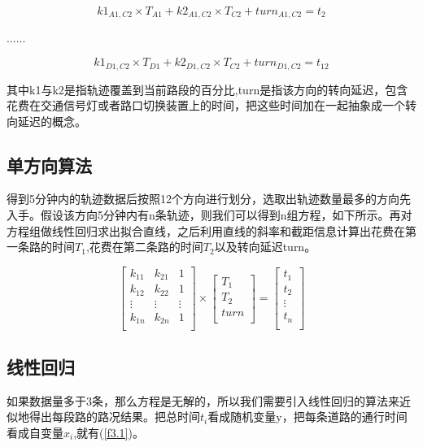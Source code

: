 \begin{equation*}
k1_{A1,C2} \times T_{A1} + k2_{A1,C2} \times T_{C2} + turn_{A1,C2} = t_{2}
\end{equation*}

......

\begin{equation*}
k1_{D1,C2} \times T_{D1} + k2_{D1,C2} \times T_{C2} + turn_{D1,C2} = t_{12}
\end{equation*}

其中k1与k2是指轨迹覆盖到当前路段的百分比,turn是指该方向的转向延迟，包含花费在交通信号灯或者路口切换装置上的时间，把这些时间加在一起抽象成一个转向延迟的概念。

\subsection{单方向算法}

得到5分钟内的轨迹数据后按照12个方向进行划分，选取出轨迹数量最多的方向先入手。假设该方向5分钟内有n条轨迹，则我们可以得到n组方程，如下所示。再对方程组做线性回归求出拟合直线，之后利用直线的斜率和截距信息计算出花费在第一条路的时间$T_{1}$,花费在第二条路的时间$T_{2}$以及转向延迟turn。

\begin{equation}
\begin{bmatrix}
k_{11}  &  k_{21}   &1\\
k_{12}  &  k_{22}   &1\\
 \vdots   & \vdots   & \vdots  \\
k_{1n}  & k_{2n}    &1\\
\end{bmatrix} \times 
\begin{bmatrix}
T_{1}  \\
T_{2}  \\
turn \\
\end{bmatrix} = 
\begin{bmatrix}
t_{1}  \\
t_{2}  \\
\vdots \\ 
t_{n} \\
\end{bmatrix}
\end{equation}

\subsection{线性回归}
如果数据量多于3条，那么方程是无解的，所以我们需要引入线性回归的算法来近似地得出每段路的路况结果。把总时间$t_{i}$看成随机变量y，把每条道路的通行时间看成自变量$x_{i}$,就有(\ref{f3.1})。

